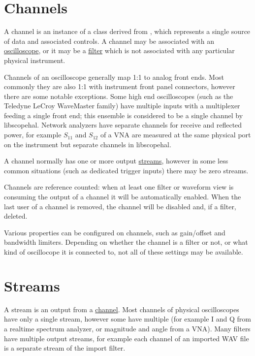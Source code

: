 \section{Channels}
\label{sec:channels}

A channel is an instance of a class derived from , which represents a single source of
data and associated controls. A channel may be associated with an \hyperref[sec:oscilloscopes]{oscilloscope}, or it may
be a \hyperref[sec:filters]{filter} which is not associated with any particular physical instrument.

Channels of an oscilloscope generally map 1:1 to analog front ends. Most commonly they are also 1:1 with instrument front
panel connectors, however there are some notable exceptions. Some high end oscilloscopes (such as the Teledyne LeCroy
WaveMaster family) have multiple inputs with a multiplexer feeding a single front end; this ensemble is considered to
be a single channel by libscopehal. Network analyzers have separate channels for receive and reflected power, for
example $S_{11}$ and $S_{12}$ of a VNA are measured at the same physical port on the instrument but separate channels
in libscopehal.

A channel normally has one or more output \hyperref[sec:streams]{streams}, however in some less common situations (such
as dedicated trigger inputs) there may be zero streams.

Channels are reference counted: when at least one filter or waveform view is consuming the output of a channel it will
be automatically enabled. When the last user of a channel is removed, the channel will be disabled and, if a filter,
deleted.

Various properties can be configured on channels, such as gain/offset and bandwidth limiters. Depending on whether the
channel is a filter or not, or what kind of oscillocope it is connected to, not all of these settings may be available.

\section{Streams}
\label{sec:streams}

A stream is an output from a \hyperref[sec:channels]{channel}. Most channels of physical oscilloscopes have only a
single stream, however some have multiple (for example I and Q from a realtime spectrum analyzer, or magnitude and
angle from a VNA). Many filters have multiple output streams, for example each channel of an imported WAV file is a
separate stream of the import filter.

